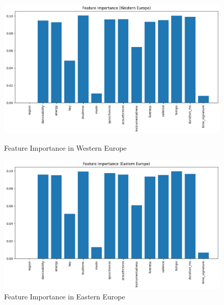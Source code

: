 \begin{figure}[h]
    \centering
    \begin{minipage}{0.45\textwidth}
        \centering
        \includegraphics[width=\linewidth]{media/rf_feature_imp_western_europe.png}
        \caption{Feature Importance in Western Europe}
    \end{minipage}%
    \hspace{0.05\textwidth} %
    \begin{minipage}{0.45\textwidth}
        \centering
        \includegraphics[width=\linewidth]{media/rf_feature_imp_eastern_europe.png}
        \caption{Feature Importance in Eastern Europe}
    \end{minipage}
\end{figure}
